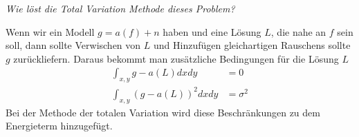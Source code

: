 \documentclass[
  ngerman,
  DIV=14
]{scrartcl}
\begin{document}
\emph{Wie löst die Total Variation Methode dieses Problem?}

Wenn wir ein Modell $g = a(f) + n$ haben und eine Lösung $L$, die nahe an $f$ sein soll, dann sollte Verwischen von $L$ und Hinzufügen gleichartigen Rauschens sollte $g$ zurückliefern. Daraus bekommt man zusätzliche Bedingungen für die Lösung $L$
\begin{align*}
\int_{x, y} g - a(L) dxdy &= 0\\
\int_{x, y} (g - a(L))^2 dxdy &= \sigma^2
\end{align*}
Bei der Methode der totalen Variation wird diese Beschränkungen zu dem Energieterm hinzugefügt.
\end{document}
